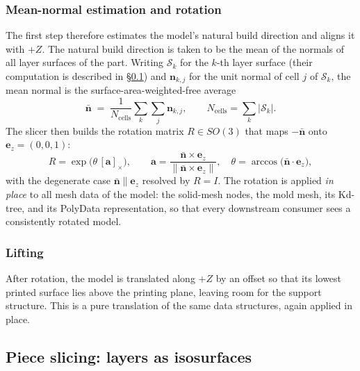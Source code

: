 \subsubsection{Mean-normal estimation and rotation}

The first step therefore estimates the model's natural build direction
and aligns it with $+Z$. The natural build direction is taken to be the
mean of the normals of all layer surfaces of the part. Writing
$\mathcal{S}_k$ for the $k$-th layer surface (their computation is
described in \S\ref{sec:meth-slicing}) and $\mathbf{n}_{k,j}$ for the
unit normal of cell $j$ of $\mathcal{S}_k$, the mean normal is the
surface-area-weighted-free average
\begin{equation}
  \bar{\mathbf{n}} \;=\; \frac{1}{N_{\mathrm{cells}}}
  \sum_{k} \sum_{j} \mathbf{n}_{k,j},
  \qquad N_{\mathrm{cells}} = \sum_k |\mathcal{S}_k|.
\end{equation}
The slicer then builds the rotation matrix $R \in SO(3)$ that maps
$-\bar{\mathbf{n}}$ onto $\mathbf{e}_z = (0,0,1)$:
\begin{equation}
  R = \exp\!\big(\theta\, [\mathbf{a}]_\times\big),
  \qquad
  \mathbf{a} = \frac{\bar{\mathbf{n}} \times \mathbf{e}_z}{\|\bar{\mathbf{n}} \times \mathbf{e}_z\|},
  \quad
  \theta = \arccos\!\big(\bar{\mathbf{n}} \cdot \mathbf{e}_z\big),
\end{equation}
with the degenerate case $\bar{\mathbf{n}} \parallel \mathbf{e}_z$
resolved by $R = I$. The rotation is applied \emph{in place} to all
mesh data of the model: the solid-mesh nodes, the mold mesh, its
Kd-tree, and its PolyData representation, so that every downstream
consumer sees a consistently rotated model.

\subsubsection{Lifting}

After rotation, the model is translated along $+Z$ by an offset so
that its lowest printed surface lies above the printing plane,
leaving room for the support structure. This is a pure translation of
the same data structures, again applied in place.

\subsection{Piece slicing: layers as isosurfaces}\label{sec:meth-slicing}

